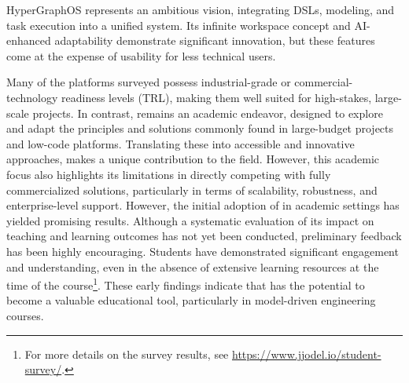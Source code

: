 HyperGraphOS \cite{Ceravola2024} represents an ambitious vision, integrating DSLs, modeling, and task execution into a unified system. Its infinite workspace concept and AI-enhanced adaptability demonstrate significant innovation, but these features come at the expense of usability for less technical users. 

Many of the platforms surveyed possess industrial-grade or commercial-technology readiness levels (TRL), making them well suited for high-stakes, large-scale projects. In contrast, \jjodel{} remains an academic endeavor, designed to explore and adapt the principles and solutions commonly found in large-budget projects and low-code platforms. Translating these into accessible and innovative approaches, \jjodel{} makes a unique contribution to the field. However, this academic focus also highlights its limitations in directly competing with fully commercialized solutions, particularly in terms of scalability, robustness, and enterprise-level support.
%
However, the initial adoption of \jjodel{} in academic settings has yielded promising results. Although a systematic evaluation of its impact on teaching and learning outcomes has not yet been conducted, preliminary feedback has been highly encouraging. Students have demonstrated significant engagement and understanding, even in the absence of extensive learning resources at the time of the course\footnote{For more details on the survey results, see \url{https://www.jjodel.io/student-survey/}.}. These early findings indicate that \jjodel{} has the potential to become a valuable educational tool, particularly in model-driven engineering courses.